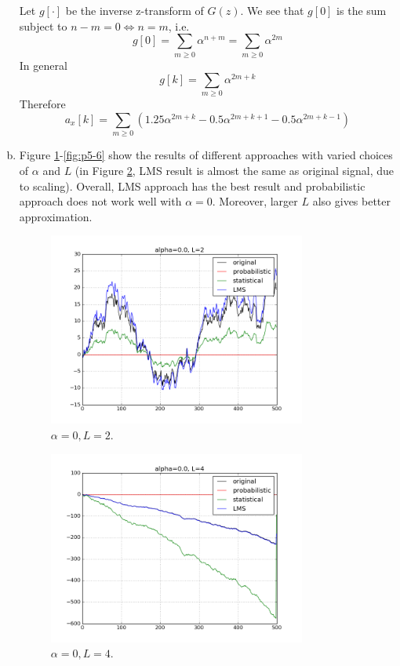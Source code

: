 \begin{enumerate}[(a)]
Let $g[\cdot]$ be the inverse z-transform of $G(z)$. We see that $g[0]$ is the sum subject to $n - m = 0 \Leftrightarrow n = m$, i.e.
\[g[0] = \sum_{m \geq 0} \alpha^{n+m} = \sum_{m \geq 0} \alpha^{2m}\]
In general
\[g[k] = \sum_{m \geq 0} \alpha^{2m+k}\]
Therefore
\[a_x[k] = \sum_{m \geq 0} (1.25 \alpha^{2m+k} - 0.5 \alpha^{2m+k+1} - 0.5 \alpha^{2m+k-1})\]

\item Figure \ref{fig:p5-1}-\ref{fig:p5-6} show the results of different approaches with varied choices of $\alpha$ and $L$ (in Figure \ref{fig:p5-2}, LMS result is almost the same as original signal, due to scaling). Overall, LMS approach has the best result and probabilistic approach does not work well with $\alpha = 0$. Moreover, larger $L$ also gives better approximation.
\begin{figure}[htbp]
	\centering
	\includegraphics[width=0.8\textwidth]{images/p5-1}
	\caption{$\alpha=0, L=2$.}
	\label{fig:p5-1}
\end{figure}

\begin{figure}[htbp]
	\centering
	\includegraphics[width=0.8\textwidth]{images/p5-2}
	\caption{$\alpha=0, L=4$.}
	\label{fig:p5-2}
\end{figure}


\end{enumerate}
